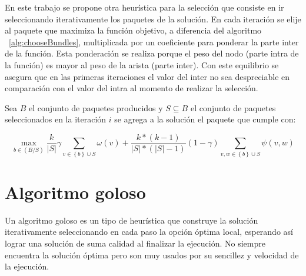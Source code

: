En este trabajo se propone otra heurística para la selección que consiste en ir seleccionando iterativamente los paquetes de la solución. En cada iteración se elije al paquete que maximiza la función objetivo, a diferencia del algoritmo ~\ref{alg:chooseBundles}, multiplicada por un coeficiente para ponderar la parte inter de la función. Esta ponderación se realiza porque el peso del nodo (parte intra de la función) es mayor al peso de la arista (parte inter). Con este equilibrio se asegura que en las primeras iteraciones el valor del inter no sea despreciable en comparación con el valor del intra al momento de realizar la selección.

Sea $B$ el conjunto de paquetes producidos y $S \subseteq B$ el conjunto de paquetes seleccionados en la iteración $i$ se agrega a la solución el paquete que cumple con:

\begin{equation}
\max_{b \in (B/S)}{\dfrac{k}{|S|}} \gamma \sum_{v \in \left\{b\right\} \cup S}{\omega(v)} + \dfrac{k * (k-1)}{|S| * (|S|-1)} (1-\gamma) \sum_{v,w \in \left\{b\right\} \cup S}{\psi(v,w)}
\end{equation}


\section{Algoritmo goloso}
Un algoritmo goloso es un tipo de heurística que construye la solución iterativamente seleccionando en cada paso la opción óptima local, esperando así lograr una solución de suma calidad al finalizar la ejecución. No siempre encuentra la solución óptima pero son muy usados por su sencillez y velocidad de la ejecución.

